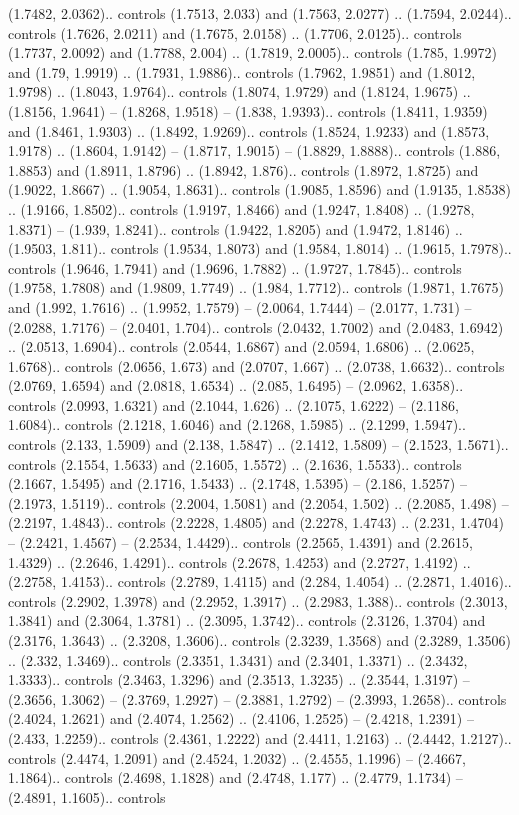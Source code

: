 (1.7482, 2.0362).. controls (1.7513, 2.033) and (1.7563, 2.0277) .. (1.7594, 2.0244).. controls (1.7626, 2.0211) and (1.7675, 2.0158) .. (1.7706, 2.0125).. controls (1.7737, 2.0092) and (1.7788, 2.004) .. (1.7819, 2.0005).. controls (1.785, 1.9972) and (1.79, 1.9919) .. (1.7931, 1.9886).. controls (1.7962, 1.9851) and (1.8012, 1.9798) .. (1.8043, 1.9764).. controls (1.8074, 1.9729) and (1.8124, 1.9675) .. (1.8156, 1.9641) -- (1.8268, 1.9518) -- (1.838, 1.9393).. controls (1.8411, 1.9359) and (1.8461, 1.9303) .. (1.8492, 1.9269).. controls (1.8524, 1.9233) and (1.8573, 1.9178) .. (1.8604, 1.9142) -- (1.8717, 1.9015) -- (1.8829, 1.8888).. controls (1.886, 1.8853) and (1.8911, 1.8796) .. (1.8942, 1.876).. controls (1.8972, 1.8725) and (1.9022, 1.8667) .. (1.9054, 1.8631).. controls (1.9085, 1.8596) and (1.9135, 1.8538) .. (1.9166, 1.8502).. controls (1.9197, 1.8466) and (1.9247, 1.8408) .. (1.9278, 1.8371) -- (1.939, 1.8241).. controls (1.9422, 1.8205) and (1.9472, 1.8146) .. (1.9503, 1.811).. controls (1.9534, 1.8073) and (1.9584, 1.8014) .. (1.9615, 1.7978).. controls (1.9646, 1.7941) and (1.9696, 1.7882) .. (1.9727, 1.7845).. controls (1.9758, 1.7808) and (1.9809, 1.7749) .. (1.984, 1.7712).. controls (1.9871, 1.7675) and (1.992, 1.7616) .. (1.9952, 1.7579) -- (2.0064, 1.7444) -- (2.0177, 1.731) -- (2.0288, 1.7176) -- (2.0401, 1.704).. controls (2.0432, 1.7002) and (2.0483, 1.6942) .. (2.0513, 1.6904).. controls (2.0544, 1.6867) and (2.0594, 1.6806) .. (2.0625, 1.6768).. controls (2.0656, 1.673) and (2.0707, 1.667) .. (2.0738, 1.6632).. controls (2.0769, 1.6594) and (2.0818, 1.6534) .. (2.085, 1.6495) -- (2.0962, 1.6358).. controls (2.0993, 1.6321) and (2.1044, 1.626) .. (2.1075, 1.6222) -- (2.1186, 1.6084).. controls (2.1218, 1.6046) and (2.1268, 1.5985) .. (2.1299, 1.5947).. controls (2.133, 1.5909) and (2.138, 1.5847) .. (2.1412, 1.5809) -- (2.1523, 1.5671).. controls (2.1554, 1.5633) and (2.1605, 1.5572) .. (2.1636, 1.5533).. controls (2.1667, 1.5495) and (2.1716, 1.5433) .. (2.1748, 1.5395) -- (2.186, 1.5257) -- (2.1973, 1.5119).. controls (2.2004, 1.5081) and (2.2054, 1.502) .. (2.2085, 1.498) -- (2.2197, 1.4843).. controls (2.2228, 1.4805) and (2.2278, 1.4743) .. (2.231, 1.4704) -- (2.2421, 1.4567) -- (2.2534, 1.4429).. controls (2.2565, 1.4391) and (2.2615, 1.4329) .. (2.2646, 1.4291).. controls (2.2678, 1.4253) and (2.2727, 1.4192) .. (2.2758, 1.4153).. controls (2.2789, 1.4115) and (2.284, 1.4054) .. (2.2871, 1.4016).. controls (2.2902, 1.3978) and (2.2952, 1.3917) .. (2.2983, 1.388).. controls (2.3013, 1.3841) and (2.3064, 1.3781) .. (2.3095, 1.3742).. controls (2.3126, 1.3704) and (2.3176, 1.3643) .. (2.3208, 1.3606).. controls (2.3239, 1.3568) and (2.3289, 1.3506) .. (2.332, 1.3469).. controls (2.3351, 1.3431) and (2.3401, 1.3371) .. (2.3432, 1.3333).. controls (2.3463, 1.3296) and (2.3513, 1.3235) .. (2.3544, 1.3197) -- (2.3656, 1.3062) -- (2.3769, 1.2927) -- (2.3881, 1.2792) -- (2.3993, 1.2658).. controls (2.4024, 1.2621) and (2.4074, 1.2562) .. (2.4106, 1.2525) -- (2.4218, 1.2391) -- (2.433, 1.2259).. controls (2.4361, 1.2222) and (2.4411, 1.2163) .. (2.4442, 1.2127).. controls (2.4474, 1.2091) and (2.4524, 1.2032) .. (2.4555, 1.1996) -- (2.4667, 1.1864).. controls (2.4698, 1.1828) and (2.4748, 1.177) .. (2.4779, 1.1734) -- (2.4891, 1.1605).. controls 